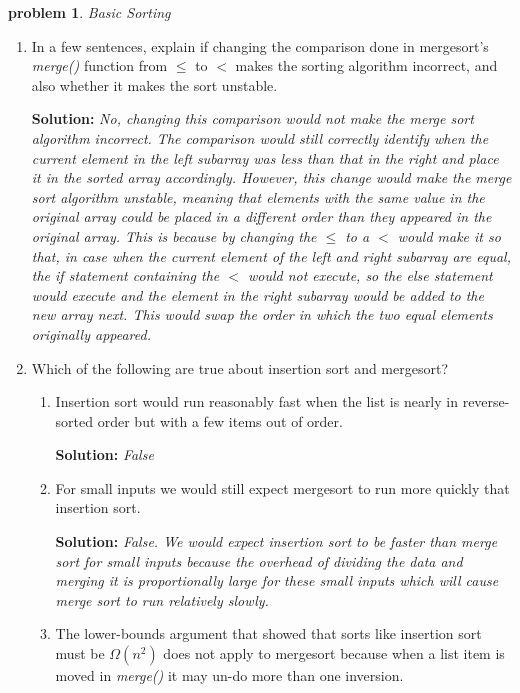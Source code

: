 \documentclass[10pt]{article}
\newtheorem{problem}{\sc\color{cit}problem}
\begin{document}
    \pagebreak

\begin{problem} Basic Sorting \end{problem}
    \begin{enumerate}   
    	\item In a few sentences, explain if changing the comparison done in mergesort's \emph{merge()} function from $\leq$ to $<$ makes the sorting algorithm incorrect, and also whether it makes the sort unstable.
    	
    	\textbf{Solution:}  \emph{No, changing this comparison would not make the merge sort algorithm incorrect. The comparison would still correctly identify when the current element in the left subarray was less than that in the right and place it in the sorted array accordingly. However, this change would make the merge sort algorithm unstable, meaning that elements with the same value in the original array could be placed in a different order than they appeared in the original array. This is because by changing the $\leq$ to a $<$ would make it so that, in case when the current element of the left and right subarray are equal, the if statement containing the $<$ would not execute, so the else statement would execute and the element in the right subarray would be added to the new array next. This would swap the order in which the two equal elements originally appeared.}
    	
    	\item Which of the following are true about insertion sort and mergesort?
    		\begin{enumerate} 
    		\item Insertion sort would run reasonably fast when the list is nearly in reverse-sorted order but with a few items out of order.
    		
    		\textbf{Solution:} \emph{False}
    		
    		\item For small inputs we would still expect mergesort to run more quickly that insertion sort.
    		
    		\textbf{Solution:} \emph{False. We would expect insertion sort to be faster than merge sort for small inputs because the overhead of dividing the data and merging it is proportionally large for these small inputs which will cause merge sort to run relatively slowly.}
    		
    		\item The lower-bounds argument that showed that sorts like insertion sort must be $\Omega(n^2)$ does not apply to mergesort because when a list item
    		is moved in \emph{merge()} it may un-do more than one inversion.    
    		

\end{enumerate}
\end{enumerate}
\end{document}
